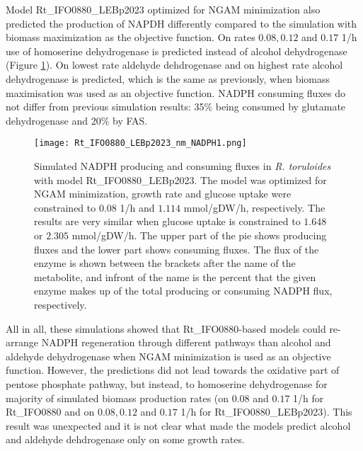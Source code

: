 Model Rt\_IFO0880\_LEBp2023 optimized for NGAM minimization also predicted the production of NAPDH differently compared to the simulation with biomass maximization as the objective function. On rates $0.08, 0.12$ and $0.17$ \unit{1/h} use of homoserine dehydrogenase is predicted instead of alcohol dehydrogenase (Figure \ref{fig:Rt_IFO0880_LEBp2023_nm_NADPH1}). 
On lowest rate aldehyde dehdrogenase and on highest rate alcohol dehydrogenase is predicted, which is the same as previously, when biomass 
maximisation was used as an objective function. NADPH consuming fluxes do not differ from previous simulation results: 35\% being consumed by glutamate dehydrogenase and 20\% by FAS.  
\begin{figure}[H]
    \centering
    \texttt{[image: Rt\_IFO0880\_LEBp2023\_nm\_NADPH1.png]}
    \caption{Simulated NADPH producing and consuming fluxes in \textit{R. toruloides} with model Rt\_IFO0880\_LEBp2023. The model was optimized for NGAM minimization, 
    growth rate and glucose uptake were constrained to $0.08$ \unit{1/h} and $1.114$ \unit{mmol/gDW/h}, respectively. The results are very similar when glucose uptake is constrained to $1.648$ or $2.305$ \unit{mmol/gDW/h}. The upper part of the pie shows producing fluxes and the lower part shows consuming fluxes.
    The flux of the enzyme is shown between the brackets after the name of the metabolite, and infront of the name is the percent
    that the given enzyme makes up of the total producing or consuming NADPH flux, respectively.}
    \label{fig:Rt_IFO0880_LEBp2023_nm_NADPH1}
\end{figure}

All in all, these simulations showed that Rt\_IFO0880-based models could re-arrange NADPH regeneration through different pathways than alcohol and aldehyde dehydrogenase when NGAM minimization is used as an objective function. However, the predictions did not lead towards the oxidative part of pentose phosphate pathway, but instead, to homoserine dehydrogenase for majority of simulated biomass production rates (on $0.08$ and $0.17$ \unit{1/h} for Rt\_IFO0880 and on $0.08, 0.12$ and $0.17$ \unit{1/h} for Rt\_IFO0880\_LEBp2023). This result was unexpected and it is not clear what made the models predict alcohol and aldehyde dehdrogenase only on some growth rates.






